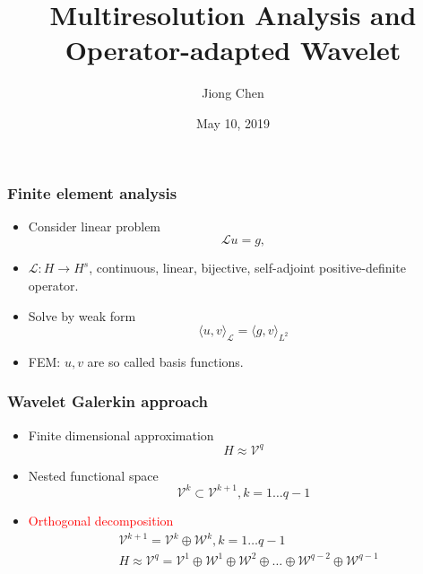 \documentclass[serif,mathserif, 12pt]{beamer}
\title[\hspace{2em}\insertframenumber/\inserttotalframenumber]{
  Multiresolution Analysis and Operator-adapted Wavelet
}
\date{May 10, 2019}
\author{Jiong Chen}
\newcommand{\TODO}[1]{\textcolor{red}{#1}}
\begin{document}
\maketitle

\begin{frame}
  \frametitle{Finite element analysis}
  \begin{itemize}
  \item Consider linear problem
    \[
    \mathcal{L}u = g,
    \]
  \item $\mathcal{L}: H\rightarrow H^s$, continuous, linear, bijective, self-adjoint positive-definite operator.
  \item Solve by weak form
    \[
    \langle u, v \rangle_\mathcal{L} = \langle g, v\rangle_{L^2}
    \]
  \item FEM: $u, v$ are so called basis functions.
  \end{itemize}
\end{frame}

\begin{frame}
  \frametitle{Wavelet Galerkin approach}
  \begin{itemize}
  \item Finite dimensional approximation
    \[
    H \approx \mathcal{V}^q
    \]
  \item Nested functional space
    \[
      \mathcal{V}^k\subset \mathcal{V}^{k+1}, k = 1\dots q-1
    \]
  \item \TODO{Orthogonal decomposition}
    \[
    \begin{split}
      &\mathcal{V}^{k+1} = \mathcal{V}^k \oplus \mathcal{W}^k, k = 1\dots q-1 \\
      &H\approx \mathcal{V}^q = \mathcal{V}^1 \oplus \mathcal{W}^1
      \oplus \mathcal{W}^2 \oplus \dots \oplus \mathcal{W}^{q-2} \oplus
      \mathcal{W}^{q-1}
    \end{split}    
    \]
  \end{itemize}
\end{frame}
\end{document}
